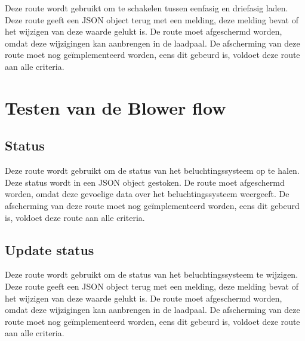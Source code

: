 Deze route wordt gebruikt om te schakelen tussen eenfasig en driefasig laden. Deze route geeft een JSON object terug met een melding, deze melding bevat of het wijzigen van deze waarde gelukt is. De route moet afgeschermd worden, omdat deze wijzigingen kan aanbrengen in de laadpaal. De afscherming van deze route moet nog geïmplementeerd worden, eens dit gebeurd is, voldoet deze route aan alle criteria.

\section{Testen van de Blower flow}
\label{sec:testresultaten-blower}

\subsection{Status}
\label{subsec:testresultaten-blower-status}

Deze route wordt gebruikt om de status van het beluchtingssysteem op te halen. Deze status wordt in een JSON object gestoken. De route moet afgeschermd worden, omdat deze gevoelige data over het beluchtingssysteem weergeeft. De afscherming van deze route moet nog geïmplementeerd worden, eens dit gebeurd is, voldoet deze route aan alle criteria.

\subsection{Update status}
\label{subsec:testresultaten-update-status}

Deze route wordt gebruikt om de status van het beluchtingssysteem te wijzigen. Deze route geeft een JSON object terug met een melding, deze melding bevat of het wijzigen van deze waarde gelukt is. De route moet afgeschermd worden, omdat deze wijzigingen kan aanbrengen in de laadpaal. De afscherming van deze route moet nog geïmplementeerd worden, eens dit gebeurd is, voldoet deze route aan alle criteria.